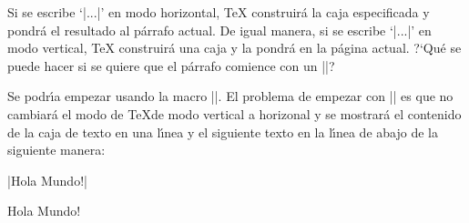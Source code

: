 


\bigskip

\enunciadoS Si se escribe `|\hbox{...}|' en modo horizontal, {\TeX} construir\'a la caja especificada y pondr\'a el resultado al p\'arrafo actual. De igual manera, si se escribe `|\hbox{...}|' en modo vertical, {\TeX} construir\'a una caja y la pondr\'a en la p\'agina actual. ?`Qu\'e se puede hacer si se quiere que el p\'arrafo comience con un |\hbox|?

\bigskip

\respuestaS Se podr\'{\i}a empezar usando la macro |\noindent|. El problema de empezar con |\hbox| es que no cambiar\'a el modo
de \TeX de modo vertical a horizonal y se mostrar\'a el contenido de la caja de texto en una
l\'{\i}nea y el siguiente texto en la l\'{\i}nea de abajo de la siguiente manera:

|\hbox{Hola} Mundo!|

\medskip

\hbox{Hola} Mundo!

\bye


